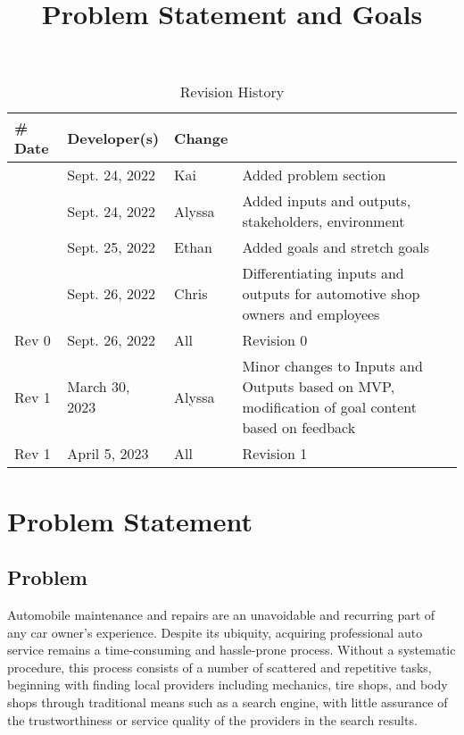 \documentclass{article}
\title{Problem Statement and Goals\\\progname}
\author{\authname}
\date{}
\begin{document}
\maketitle

\begin{table}[hp]
\caption{Revision History} \label{TblRevisionHistory}
\begin{tabularx}{\textwidth}{lllX}
\toprule
\textbf{\#} \textbf{Date} & \textbf{Developer(s)} & \textbf{Change}\\
\midrule
& Sept. 24, 2022 & Kai & Added problem section\\
& Sept. 24, 2022 & Alyssa & Added inputs and outputs, stakeholders, environment\\
& Sept. 25, 2022 & Ethan & Added goals and stretch goals\\
& Sept. 26, 2022 & Chris & Differentiating inputs and outputs for automotive shop owners and employees\\
Rev 0 & Sept. 26, 2022 & All  & Revision 0\\
Rev 1 & March 30, 2023 & Alyssa & Minor changes to Inputs and Outputs based on MVP, modification of goal content based on feedback\\
Rev 1 & April 5, 2023 & All & Revision 1\\
\bottomrule
\end{tabularx}
\end{table}

\section{Problem Statement}


\subsection{Problem}

Automobile maintenance and repairs are an unavoidable and recurring part of any
car owner's experience. Despite its ubiquity, acquiring professional auto 
service remains a time-consuming and hassle-prone process. Without a systematic
procedure, this process consists of a number of scattered and repetitive tasks,
beginning with finding local providers including mechanics, tire shops, and 
body shops through traditional means such as a search engine, with little
assurance of the trustworthiness or service quality of the providers in the 
search results.\\
\end{document}
